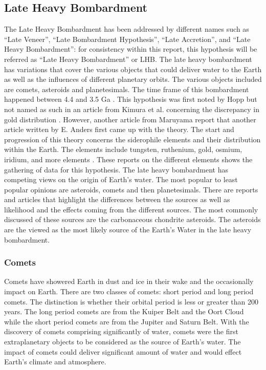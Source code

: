 \subsection{Late Heavy Bombardment}
The Late Heavy Bombardment has been addressed by different names such as “Late Veneer”, “Late Bombardment Hypothesis”, “Late Accretion”, and “Late Heavy Bombardment”: for consistency within this report, this hypothesis will be referred as “Late Heavy Bombardment” or LHB. The late heavy bombardment has variations that cover the various objects that could deliver water to the Earth as well as the influences of different planetary orbits. The various objects included are comets, asteroids and planetesimals. The time frame of this bombardment happened between 4.4 and 3.5 Ga \cite{LHB_Timeframe}. This hypothesis was first noted by Hopp\cite{BOMB1} but not named as such in an article from Kimura et al. concerning the discrepancy in gold distribution \cite{BOMB2}. However, another article from Maruyama \cite{BOMB3} report that another article written by E. Anders \cite{BOMB4} first came up with the theory. The start and progression of this theory concerns the siderophile elements and their distribution within the Earth. The elements include tungsten, ruthenium, gold, osmium, iridium, and more elements \cite{BOMB5} \cite{BOMB6} \cite{BOMB7}. These reports on the different elements shows the gathering of data for this hypothesis. The late heavy bombardment has competing views on the origin of Earth’s water. The most popular to least popular opinions are asteroids, comets and then planetesimals. There are reports and articles \cite{morbidelli2000source} \cite{BOMB9} \cite{BOMB10} that highlight the differences between the sources as well as likelihood and the effects coming from the different sources. The most commonly discussed of these sources are the carbonaceous chondrite asteroids. The asteroids are the viewed as the most likely source of the Earth’s Water in the late heavy bombardment.

\subsubsection{Comets}
Comets have showered Earth in dust and ice in their wake and the occasionally impact on Earth. 
There are two classes of comets: short period and long period comets. 
The distinction is whether their orbital period is less or greater than 200 years. 
The long period comets are from the Kuiper Belt and the Oort Cloud while the short period comets are from the Jupiter and Saturn Belt.
With the discovery of comets comprising significantly of water, comets were the first extraplanetary objects to be considered as the source of Earth's water. The impact of comets could deliver significant amount of water and would effect Earth's climate and atmosphere.


